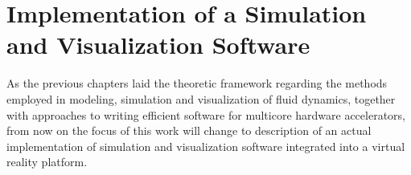 %
%
%
%
%
%
%


\section{Implementation of a Simulation and Visualization Software} \label{sec:implementation}
As the previous chapters laid the theoretic framework regarding the methods employed in modeling, simulation and visualization of fluid dynamics, together with approaches to writing efficient software for multicore hardware accelerators, from now on the focus of this work will change to description of an actual  implementation of simulation and visualization software integrated into a virtual reality platform.

